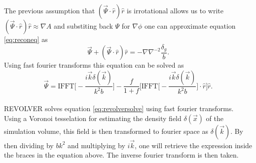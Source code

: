 The previous assumption that $(\vec{\Psi}\cdot\hat{r})\hat{r}$ is irrotational
allows us to write $(\vec{\Psi}\cdot\hat{r})\hat{r}\approx\nabla A$ and
substiting back $\Psi$ for $\nabla\phi$ one can approximate equation
\ref{eq:reconeq} as 
\begin{equation}
    \vec{\Psi}+(\vec{\Psi}\cdot\hat{r})\hat{r}=-\nabla\nabla^{-2}\frac{\delta_g}{b}.
\end{equation}
Using fast fourier transforms this equation can be solved as \cite{Burden_reconstruction}
\begin{equation}\label{eq:revolversolve}
    \vec{\Psi}=\mathrm{IFFT}\Big[-\frac{i\vec{k}\delta(\vec{k})}{k^2b}\Big]-\frac{f}{1+f}\Big[\mathrm{IFFT}\Big[-\frac{i\vec{k}\delta(\vec{k})}{k^2b}\Big]\cdot\hat{r}\Big]\hat{r}.
\end{equation}
\\\indent
REVOLVER solves equation \ref{eq:revolversolve} using fast fourier transforms.
Using a Voronoi tesselation for estimating the density field $\delta(\vec{x})$ of
the simulation volume, this field is then transformed to fourier space as
$\delta(\vec{k})$. By then dividing by $bk^2$ and multiplying by $i\vec{k}$, one
will retrieve the expression inside the braces in the equation above. The
inverse fourier transform is then taken.
